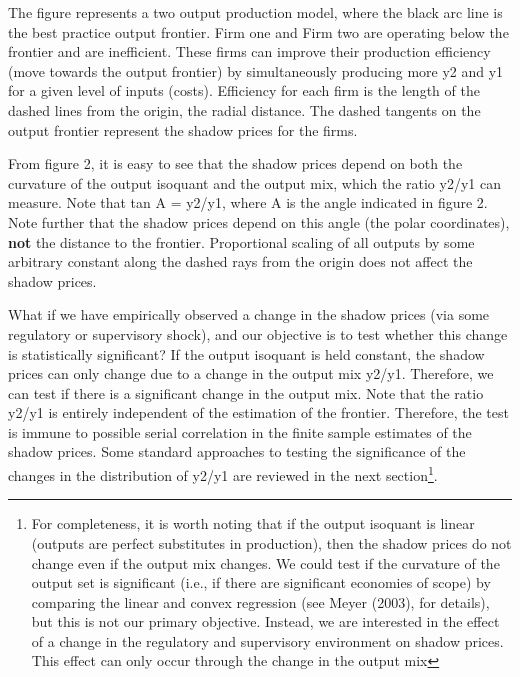 \documentclass[
  10pt,
]{article}
\begin{document}
\begin{footnotesize} 
The figure represents a two output production model, where the black arc line is the best practice output frontier. Firm one and Firm two are operating below the frontier and are inefficient. These firms can improve their production efficiency (move towards the output frontier) by simultaneously producing more y2 and y1 for a given level of inputs (costs). Efficiency for each firm is the length of the dashed lines from the origin, the radial distance.  The dashed tangents on the output frontier represent the shadow prices for the firms.
\end{footnotesize}

From figure 2, it is easy to see that the shadow prices depend on both
the curvature of the output isoquant and the output mix, which the ratio
y2/y1 can measure. Note that tan A = y2/y1, where A is the angle
indicated in figure 2. Note further that the shadow prices depend on
this angle (the polar coordinates), \textbf{not} the distance to the
frontier. Proportional scaling of all outputs by some arbitrary constant
along the dashed rays from the origin does not affect the shadow prices.

What if we have empirically observed a change in the shadow prices (via
some regulatory or supervisory shock), and our objective is to test
whether this change is statistically significant? If the output isoquant
is held constant, the shadow prices can only change due to a change in
the output mix y2/y1. Therefore, we can test if there is a significant
change in the output mix. Note that the ratio y2/y1 is entirely
independent of the estimation of the frontier. Therefore, the test is
immune to possible serial correlation in the finite sample estimates of
the shadow prices. Some standard approaches to testing the significance
of the changes in the distribution of y2/y1 are reviewed in the next
section\footnote{For completeness, it is worth noting that if the output
  isoquant is linear (outputs are perfect substitutes in production),
  then the shadow prices do not change even if the output mix changes.
  We could test if the curvature of the output set is significant (i.e.,
  if there are significant economies of scope) by comparing the linear
  and convex regression (see Meyer (2003), for details), but this is not
  our primary objective. Instead, we are interested in the effect of a
  change in the regulatory and supervisory environment on shadow prices.
  This effect can only occur through the change in the output mix}.
\end{document}
